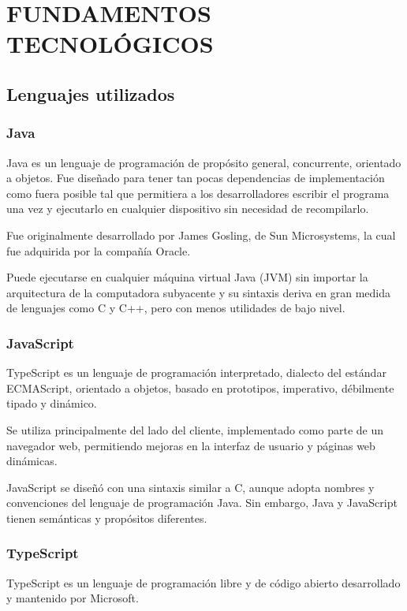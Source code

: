 \chapter[Fundamentos tecnológicos]{
  \label{chp:fundamentos}
  FUNDAMENTOS TECNOLÓGICOS
}

\thispagestyle{numberingStyle}
\pagestyle{numberingStyle}


\section{Lenguajes utilizados}
\subsection{Java}
Java es un lenguaje de programación de propósito general, concurrente, orientado a objetos. Fue diseñado para tener tan pocas dependencias de implementación como fuera posible tal que permitiera a los desarrolladores escribir el programa una vez y ejecutarlo en cualquier dispositivo sin necesidad de recompilarlo.

Fue originalmente desarrollado por James Gosling, de Sun Microsystems, la cual fue adquirida por la compañía Oracle.

Puede ejecutarse en cualquier máquina virtual Java (JVM) sin importar la arquitectura de la computadora subyacente y su sintaxis deriva en gran medida de lenguajes como C y C++, pero con menos utilidades de bajo nivel.

\subsection{JavaScript}
TypeScript es un lenguaje de programación interpretado, dialecto del estándar ECMAScript, orientado a objetos, basado en prototipos, imperativo, débilmente tipado y dinámico.

Se utiliza principalmente del lado del cliente, implementado como parte de un navegador web, permitiendo mejoras en la interfaz de usuario y páginas web dinámicas.

JavaScript se diseñó con una sintaxis similar a C, aunque adopta nombres y convenciones del lenguaje de programación Java. Sin embargo, Java y JavaScript tienen semánticas y propósitos diferentes.

\subsection{TypeScript}
TypeScript es un lenguaje de programación libre y de código abierto desarrollado y mantenido por Microsoft.

